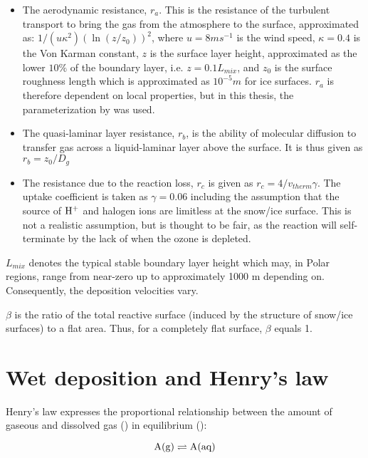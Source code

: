 \begin{itemize}
    \item The aerodynamic resistance, $r_a$. This is the resistance of the turbulent transport to bring the gas from the atmosphere to the surface, approximated as: $1/(u\kappa^2)(\ln(z/z_0))^2$, where $u = 8 ms^{-1}$ is the wind speed, $\kappa = 0.4$ is the Von Karman constant, $z$ is the surface layer height, approximated as the lower $10\%$ of the boundary layer, i.e. $z = 0.1L_{mix}$, and $z_0$ is the surface roughness length which is approximated as $10^{-5} m$ for ice surfaces. $r_a$ is therefore dependent on local properties, but in this thesis, the parameterization by \cite{CAO} was used. 
    \item The quasi-laminar layer resistance, $r_b$, is the ability of molecular diffusion to transfer gas across a liquid-laminar layer above the surface. It is thus given as $r_b = z_0/D_g$
    \item The resistance due to the reaction loss, $r_c$ is given as $r_c = 4/v_{therm}\gamma$. The uptake coefficient is taken as $\gamma = 0.06$ including the assumption that the source of $\mathrm{H^+}$ and halogen ions are limitless at the snow/ice surface. This is not a realistic assumption, but is thought to be fair, as the reaction will self-terminate by the lack of  when the ozone is depleted. 
\end{itemize}

$L_{mix}$ denotes the typical stable boundary layer height which may, in Polar regions, range from near-zero up to approximately 1000 m depending on. Consequently, the deposition velocities vary.

\medskip

$\beta$ is the ratio of the total reactive surface (induced by the structure of snow/ice surfaces) to a flat area. Thus, for a completely flat surface, $\beta$ equals 1. 





\section{Wet deposition and Henry's law}\label{sec:wet_dep_henrys_law}

Henry's law expresses the proportional relationship between the amount of gaseous and dissolved gas () in equilibrium (\cite{SeinfeldSpyros}): 

\begin{equation*}
    \mathrm{A(g)} \rightleftharpoons \mathrm{A(aq)}
\end{equation*}

